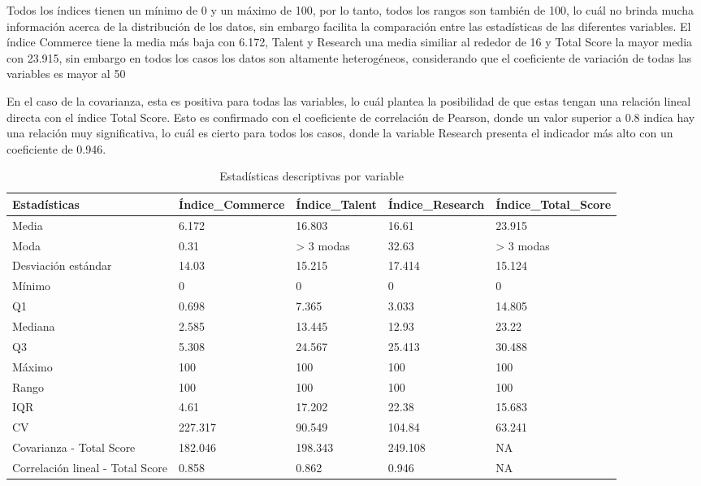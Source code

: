 \documentclass[
]{article}
\begin{document}
\begin{multicols}{2}
Todos los índices tienen un mínimo de 0 y un máximo de 100, por lo tanto, todos los rangos son también de 100, lo cuál no brinda mucha información acerca de la distribución de los datos, sin embargo facilita la comparación entre las estadísticas de las diferentes variables. El índice Commerce tiene la media más baja con 6.172, Talent y Research una media similiar al rededor de 16 y Total Score la mayor media con 23.915, sin embargo en todos los casos los datos son altamente heterogéneos, considerando que el coeficiente de variación de todas las variables es mayor al 50%

En el caso de la covarianza, esta es positiva para todas las variables, lo cuál plantea la posibilidad de que estas tengan una relación lineal directa con el índice Total Score. Esto es confirmado con el coeficiente de correlación de Pearson, donde un valor superior a 0.8 indica hay una relación muy significativa, lo cuál es cierto para todos los casos, donde la variable Research presenta el indicador más alto con un coeficiente de 0.946.

\end{multicols}

\renewcommand{\arraystretch}{1.5}
\begin{footnotesize}
\begin{longtable}[t]{lllll}
\caption{\label{tab:resultados}Estadísticas descriptivas por variable}\\
\toprule
Estadísticas & Índice\_Commerce & Índice\_Talent & Índice\_Research & Índice\_Total\_Score\\
\midrule
Media & 6.172 & 16.803 & 16.61 & 23.915\\
Moda & 0.31 & > 3 modas & 32.63 & > 3 modas\\
Desviación estándar & 14.03 & 15.215 & 17.414 & 15.124\\
Mínimo & 0 & 0 & 0 & 0\\
Q1 & 0.698 & 7.365 & 3.033 & 14.805\\
\addlinespace
Mediana & 2.585 & 13.445 & 12.93 & 23.22\\
Q3 & 5.308 & 24.567 & 25.413 & 30.488\\
Máximo & 100 & 100 & 100 & 100\\
Rango & 100 & 100 & 100 & 100\\
IQR & 4.61 & 17.202 & 22.38 & 15.683\\
\addlinespace
CV & 227.317 & 90.549 & 104.84 & 63.241\\
Covarianza - Total Score & 182.046 & 198.343 & 249.108 & NA\\
Correlación lineal - Total Score & 0.858 & 0.862 & 0.946 & NA\\
\bottomrule
\end{longtable}

\end{footnotesize}\renewcommand{\arraystretch}{1}
\end{document}
